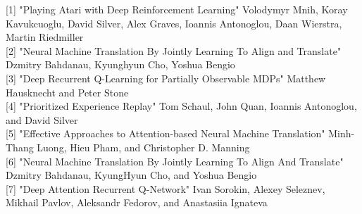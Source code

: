 \documentclass{article}
\begin{document}
[1] "Playing Atari with Deep Reinforcement Learning" Volodymyr Mnih, Koray Kavukcuoglu, David Silver, Alex Graves, Ioannis Antonoglou, Daan Wierstra, Martin Riedmiller \\

[2] "Neural Machine Translation By Jointly Learning To Align and Translate" Dzmitry Bahdanau, Kyunghyun Cho, Yoshua Bengio \\

[3] "Deep Recurrent Q-Learning for Partially Observable MDPs" Matthew Hausknecht and Peter Stone \\

[4] "Prioritized Experience Replay" Tom Schaul, John Quan, Ioannis Antonoglou, and David Silver \\

[5] "Effective Approaches to Attention-based Neural Machine Translation" Minh-Thang Luong, Hieu Pham, and Christopher D. Manning \\

[6] "Neural Machine Translation By Jointly Learning To Align And Translate" Dzmitry Bahdanau, KyungHyun Cho, and Yoshua Bengio \\

[7] "Deep Attention Recurrent Q-Network" Ivan Sorokin, Alexey Seleznev, Mikhail Pavlov, Aleksandr Fedorov, and Anastasiia Ignateva \\
\end{document}
